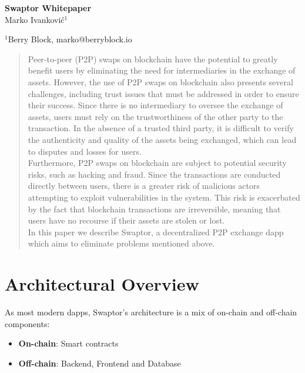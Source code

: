 \documentclass[12pt]{article}
\begin{document}
\baselineskip 12pt

\pagestyle{fancy}
\fancyhf{}

\begin{center}
  \textbf{\Large Swaptor Whitepaper} \\

  \vspace{1.5cc}
  { \sc Marko Ivanković$^{1}$}\\

  \vspace{0.3 cm}

  {\small $^{1}$Berry Block, marko@berryblock.io}
\end{center}
\vspace{1.5cc}

\begin{abstract}
  \noindent  Peer-to-peer (P2P) swaps on blockchain have the potential to greatly benefit users by eliminating the need for intermediaries in the exchange of assets. However, the use of P2P swaps on blockchain also presents several challenges, including trust issues that must be addressed in order to ensure their success.  Since there is no intermediary to oversee the exchange of assets, users must rely on the trustworthiness of the other party to the transaction. In the absence of a trusted third party, it is difficult to verify the authenticity and quality of the assets being exchanged, which can lead to disputes and losses for users.
  \\ \indent Furthermore, P2P swaps on blockchain are subject to potential security risks, such as hacking and fraud. Since the transactions are conducted directly between users, there is a greater risk of malicious actors attempting to exploit vulnerabilities in the system. This risk is exacerbated by the fact that blockchain transactions are irreversible, meaning that users have no recourse if their assets are stolen or lost.
  \\ \indent In this paper we describe Swaptor, a decentralized P2P exchange dapp which aims to eliminate problems mentioned above.

  \vspace{0.95cc}
\end{abstract}

\newpage

\tableofcontents

\newpage

\section{Architectural Overview} \label{form}
\indent As most modern dapps, Swaptor's architecture is a mix of on-chain and off-chain components:
\begin{itemize}
  \item \textbf{On-chain}: Smart contracts
  \item \textbf{Off-chain}: Backend, Frontend and Database
\end{itemize}
\end{document}
